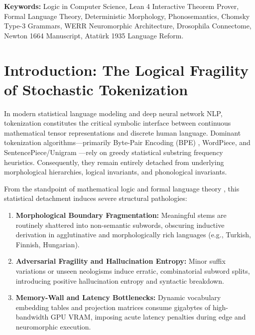 \documentclass[11pt,a4paper]{article}
\begin{document}
\noindent\textbf{Keywords:} Logic in Computer Science, Lean 4 Interactive Theorem Prover, Formal Language Theory, Deterministic Morphology, Phonosemantics, Chomsky Type-3 Grammars, WERR Neuromorphic Architecture, Drosophila Connectome, Newton 1664 Manuscript, Atatürk 1935 Language Reform.

\section{Introduction: The Logical Fragility of Stochastic Tokenization}

In modern statistical language modeling and deep neural network NLP, tokenization constitutes the critical symbolic interface between continuous mathematical tensor representations and discrete human language. Dominant tokenization algorithms---primarily Byte-Pair Encoding (BPE) \cite{sennrich2016bpe}, WordPiece, and SentencePiece/Unigram \cite{kudo2018subword}---rely on greedy statistical substring frequency heuristics. Consequently, they remain entirely detached from underlying morphological hierarchies, logical invariants, and phonological invariants.

From the standpoint of mathematical logic and formal language theory \cite{chomsky1957syntactic}, this statistical detachment induces severe structural pathologies:
\begin{enumerate}
    \item \textbf{Morphological Boundary Fragmentation:} Meaningful stems are routinely shattered into non-semantic subwords, obscuring inductive derivation in agglutinative and morphologically rich languages (e.g., Turkish, Finnish, Hungarian).
    \item \textbf{Adversarial Fragility and Hallucination Entropy:} Minor suffix variations or unseen neologisms induce erratic, combinatorial subword splits, introducing positive hallucination entropy and syntactic breakdown.
    \item \textbf{Memory-Wall and Latency Bottlenecks:} Dynamic vocabulary embedding tables and projection matrices consume gigabytes of high-bandwidth GPU VRAM, imposing acute latency penalties during edge and neuromorphic execution.
\end{enumerate}
\end{document}
